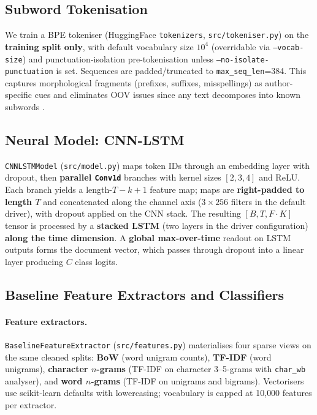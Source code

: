 \documentclass[11pt]{article}
\begin{document}
\subsection{Subword Tokenisation}
\label{sec:tokenisation}

We train a BPE tokeniser (HuggingFace \texttt{tokenizers}, \texttt{src/tokeniser.py}) on the \textbf{training split only}, with default vocabulary size \(10^4\) (overridable via \texttt{--vocab-size}) and punctuation-isolation pre-tokenisation unless \texttt{--no-isolate-punctuation} is set.
Sequences are padded/truncated to \texttt{max\_seq\_len}=384.
This captures morphological fragments (prefixes, suffixes, misspellings) as author-specific cues and eliminates OOV issues since any text decomposes into known subwords \citep{sennrich2016neural}.

\subsection{Neural Model: CNN-LSTM}
\label{sec:cnn-lstm}
\texttt{CNNLSTMModel} (\texttt{src/model.py}) maps token IDs through an embedding layer with dropout, then \textbf{parallel \texttt{Conv1d}} branches with kernel sizes \([2,3,4]\) and ReLU.
Each branch yields a length-\(T-k+1\) feature map; maps are \textbf{right-padded to length \(T\)} and concatenated along the channel axis (\(3\times256\) filters in the default driver), with dropout applied on the CNN stack.
The resulting \([B,T,F\cdot K]\) tensor is processed by a \textbf{stacked LSTM} (two layers in the driver configuration) \textbf{along the time dimension}.
A \textbf{global max-over-time} readout on LSTM outputs forms the document vector, which passes through dropout into a linear layer producing \(C\) class logits.

\subsection{Baseline Feature Extractors and Classifiers}
\label{sec:baselines}

\paragraph{Feature extractors.}
\texttt{BaselineFeatureExtractor} (\texttt{src/features.py}) materialises four sparse views on the same cleaned splits: \textbf{BoW} (word unigram counts), \textbf{TF-IDF} (word unigrams), \textbf{character $n$-grams} (TF-IDF on character 3--5-grams with \texttt{char\_wb} analyser), and \textbf{word $n$-grams} (TF-IDF on unigrams and bigrams).
Vectorisers use scikit-learn defaults with lowercasing; vocabulary is capped at 10{,}000 features per extractor.
\end{document}
